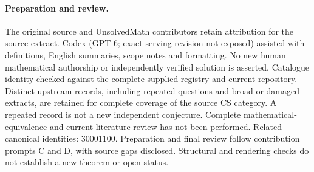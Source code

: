 \documentclass[11pt]{article}
\begin{document}
\paragraph{Preparation and review.}
The original source and UnsolvedMath contributors retain attribution for the source extract. Codex (GPT-6; exact serving revision not exposed) assisted with definitions, English summaries, scope notes and formatting. No new human mathematical authorship or independently verified solution is asserted. Catalogue identity checked against the complete supplied registry and current repository. Distinct upstream records, including repeated questions and broad or damaged extracts, are retained for complete coverage of the source CS category. A repeated record is not a new independent conjecture. Complete mathematical-equivalence and current-literature review has not been performed. Related canonical identities: 30001100. Preparation and final review follow contribution prompts C and D, with source gaps disclosed. Structural and rendering checks do not establish a new theorem or open status.
\label{end:statement}
\end{document}
